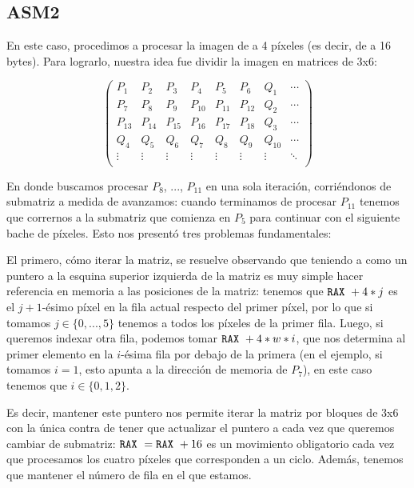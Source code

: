 \subsection{ASM2}

En este caso, procedimos a procesar la imagen de a 4 píxeles (es decir, de a 16 bytes). Para lograrlo, nuestra idea fue dividir la imagen en matrices de 3x6:

$$\begin{pmatrix}
P_1 & P_2 & P_3 & P_4 & P_5 & P_6 & Q_1 & \cdots\\
P_7 & P_8 & P_9 & P_{10} & P_{11} & P_{12} & Q_2 & \cdots\\
P_{13} & P_{14} & P_{15} & P_{16}& P_{17} & P_{18} & Q_3 & \cdots\\
Q_4 & Q_5 & Q_6 & Q_7 & Q_8 & Q_9 & Q_{10} & \cdots\\
\vdots & \vdots & \vdots & \vdots & \vdots & \vdots & \vdots & \ddots\\
\end{pmatrix}$$

En donde buscamos procesar $P_8$, ..., $P_{11}$ en una sola iteración, corriéndonos de submatriz a medida de avanzamos: cuando terminamos de procesar $P_{11}$ tenemos que corrernos a la submatriz que comienza en $P_5$ para continuar con el siguiente bache de píxeles. Esto nos presentó tres problemas fundamentales:

El primero, cómo iterar la matriz, se resuelve observando que teniendo a \rax como un puntero a la esquina superior izquierda de la matriz es muy simple hacer referencia en memoria a las posiciones de la matriz: tenemos que $\texttt{RAX}\  + 4*j$ es el $j + 1$-ésimo píxel en la fila actual respecto del primer píxel, por lo que si tomamos $j \in \{0, ..., 5\}$ tenemos a todos los píxeles de la primer fila. Luego, si queremos indexar otra fila, podemos tomar $\texttt{RAX}\  + 4*w*i$, que nos determina al primer elemento en la $i$-ésima fila por debajo de la primera (en el ejemplo, si tomamos $i = 1$, esto apunta a la dirección de memoria de $P_7$), en este caso tenemos que $i \in \{0, 1, 2\}$.

Es decir, mantener este puntero nos permite iterar la matriz por bloques de 3x6 con la única contra de tener que actualizar el puntero a \rax cada vez que queremos cambiar de submatriz: $\texttt{RAX}\  = \texttt{RAX}\  + 16$ es un movimiento obligatorio cada vez que procesamos los cuatro píxeles que corresponden a un ciclo. Además, tenemos que mantener el número de fila en el que estamos.

